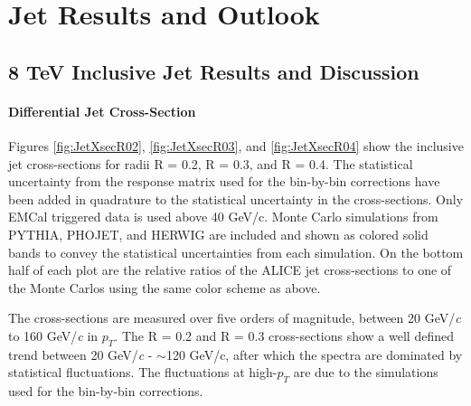\chapter{Jet Results and Outlook} \label{ch:cando}

\section{8 TeV Inclusive Jet Results and Discussion}

\subsubsection{Differential Jet Cross-Section}


\noindent
Figures \ref{fig:JetXsecR02}, \ref{fig:JetXsecR03}, and \ref{fig:JetXsecR04} show the inclusive jet cross-sections for radii R = 0.2, R = 0.3, and R = 0.4.  The statistical uncertainty from the response matrix used for the bin-by-bin corrections have been added in quadrature to the statistical uncertainty in the cross-sections.  Only EMCal triggered data is used above 40 GeV/c.  Monte Carlo simulations from PYTHIA, PHOJET, and HERWIG are included and shown as colored solid bands to convey the statistical uncertainties from each simulation.  On the bottom half of each plot are the relative ratios of the ALICE jet cross-sections to one of the Monte Carlos using the same color scheme as above.  

The cross-sections are measured over five orders of magnitude, between 20 GeV/\textit{c} to 160 GeV/\textit{c} in $p_{T}$. The R = 0.2 and R = 0.3 cross-sections show a well defined trend between 20 GeV/\textit{c} - $\sim$120 GeV/c, after which the spectra are dominated by statistical fluctuations.  The fluctuations at high-$p_{T}$ are due to the simulations used  for the bin-by-bin corrections.  

